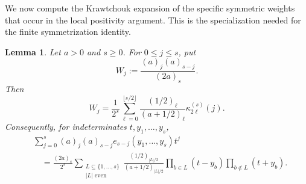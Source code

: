 \documentclass[10pt,a4paper]{amsart}
\newtheorem{Lemma}[Theorem]{Lemma}
\theoremstyle{definition}
\begin{document}
We now compute the Krawtchouk expansion of the specific symmetric weights
that occur in the local positivity argument.  This is the specialization
needed for the finite symmetrization identity.

\begin{Lemma} \label{lem:finite-symmetrization}
Let $a>0$ and $s\ge0$.  For $0\le j\le s$, put
\[
W_j:=\frac{(a)_j(a)_{s-j}}{(2a)_s}.
\]
Then
\begin{equation}\label{9.4}
W_j
=
\frac1{2^s}
\sum_{\ell=0}^{\lfloor s/2\rfloor}
\frac{(1/2)_\ell}{(a+1/2)_\ell}
\kappa_{2\ell}^{(s)}(j).
\end{equation}
Consequently, for indeterminates $t,y_1,\ldots,y_s$,
\begin{equation}\label{9.5}
\begin{aligned}
&\sum_{j=0}^s
(a)_j(a)_{s-j}e_{s-j}(y_1,\ldots,y_s)t^j\\
&\quad=
\frac{(2a)_s}{2^s}
\sum_{\substack{L\subseteq\{1,\ldots,s\}\\|L|\text{ even}}}
\frac{(1/2)_{|L|/2}}{(a+1/2)_{|L|/2}}
\prod_{b\in L}(t-y_b)
\prod_{b\notin L}(t+y_b).
\end{aligned}
\end{equation}
\end{Lemma}
\end{document}
